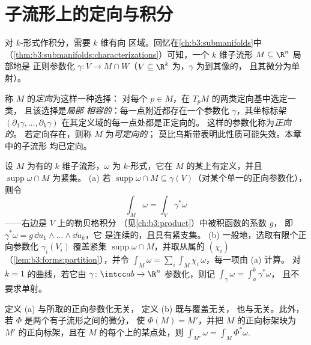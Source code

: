 \section{子流形上的定向与积分}

对 $k$-形式作积分，需要 $k$ 维有向
区域。回忆在\cref{ch:b3:submanifolds}中
（\cref{thm:b3:submanifolds:characterizations}）可知，一个
$k$ 维子流形 $M \subseteq \R^n$ 局部地是
正则参数化 $\gamma\colon V \to M \cap W$（$V
\subseteq \R^k$ 为，$\gamma$ 为到其像的，
且其微分为单射）。

\begin{definition}\label{def:b3:forms:orientation}
称 $M$ 的\emph{定向}为这样一种选择：
对每个 $p \in M$，在 $T_pM$ 的两类定向基中选定一类，
且该选择是\emph{局部
相容的}：每一点附近都存在一个参数化
$\gamma$，其坐标标架 $(\partial_1\gamma, \dots,
\partial_k\gamma)$ 在其定义域的每一点处都是正定向的。
这样的参数化称为\emph{正向的}。
若定向存在，则称 $M$ 为\emph{可定向的}；
莫比乌斯带表明此性质可能失效。本章中的子流形
均已定向。
\end{definition}

\begin{definition}[形式的积分]\label{def:b3:forms:integral}
设 $M$ 为有的 $k$ 维子流形，$\omega$ 为
$k$-形式，它在 $M$ 的某上有定义，并且
$\operatorname{supp}\omega \cap M$ 为紧集。
(a) 若 $\operatorname{supp}\omega \cap M \subseteq
\gamma(V)$（对某个单一的正向参数化），则令
\[
\int_M\omega = \int_V\gamma^*\omega
\]
——右边是 $V$ 上的勒贝格积分
（见\cref{ch:b3:product}）中被积函数的系数 $g$，
即 $\gamma^*\omega = g\,\dd u_1\wedge\dots\wedge\dd u_k$，它
是连续的，且具有紧支集。
(b) 一般地，选取有限个正向参数化
$\gamma_i(V_i)$ 覆盖紧集
$\operatorname{supp}\omega \cap M$，并取从属的
 $(\chi_i)$
（\cref{lem:b3:forms:partition}），并令 $\int_M\omega =
\sum_i\int_M\chi_i\,\omega$，每一项由 (a) 计算。
对 $k = 1$ 的曲线，若它由
$\gamma\colon\intcc ab\to\R^n$ 参数化，则记
$\int_\gamma\omega = \int_a^b\gamma^*\omega$，
且不要求单射。
\end{definition}

\begin{lemma}[相容性]\label{lem:b3:forms:consistency}
定义 (a) 与所取的正向参数化无关，
定义 (b) 既与覆盖无关，
也与无关。此外，若
$\Phi$ 是两个有子流形之间的微分，
使 $\Phi(M) = M'$，并把
$M$ 的正向标架映为 $M'$ 的正向标架，且在
$M$ 的每个上的某点处，则 $\int_{M'}\omega =
\int_M\Phi^*\omega$.
\end{lemma}

